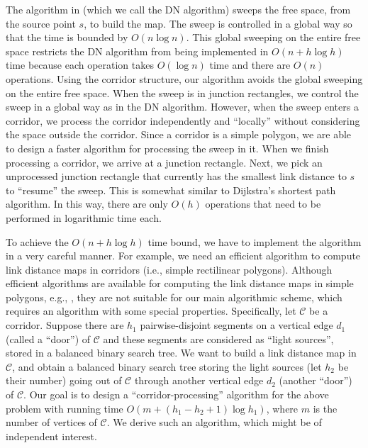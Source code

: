 \documentclass[english,runningheads,11pt]{llncs-revised}
\def\calC{\mathcal{C}}
\begin{document}
The algorithm in \cite{ref:DasGe91} (which we call the DN algorithm) sweeps the free space, from the source point $s$, to build the map.
The sweep is controlled in a global way so that the time is bounded by
$O(n\log n)$. This global sweeping on the entire free space restricts the DN algorithm from being implemented in $O(n+h\log h)$ time because each operation takes $O(\log n)$ time and there are $O(n)$ operations. Using the corridor structure, our algorithm avoids the global sweeping on the entire free space.
When the sweep is in junction rectangles, we control the sweep in a global way as
in the DN algorithm. However, when the sweep enters a corridor,
we process the corridor independently and ``locally'' without considering the
space outside the corridor. Since a
corridor is a simple polygon, we are able to design a
faster algorithm for processing the sweep in it.
When we finish processing a corridor, we arrive at a junction rectangle.
Next, we pick an unprocessed junction
rectangle that currently has the smallest link distance to $s$ to
``resume'' the sweep. This is somewhat similar to Dijkstra's shortest path algorithm.
In this way, there are only $O(h)$ operations that need to be performed in logarithmic time each.


To achieve the $O(n+h\log h)$ time bound, we have to implement the algorithm in a very careful manner. For example, we need an efficient
algorithm to compute link distance maps in corridors (i.e.,
simple rectilinear polygons).
Although efficient algorithms are available for computing the link
distance maps in simple polygons, e.g.,
\cite{ref:deBergOn91,ref:HershbergerCo94,ref:LingasOp95,ref:SchuiererAn96},
they are not suitable for our main algorithmic scheme, which requires
an algorithm with some special properties. Specifically, let
$\calC$ be a corridor. Suppose there are $h_1$
pairwise-disjoint segments on a vertical edge $d_1$ (called a
``door'') of $\calC$ and these segments are considered as ``light sources'', stored in a balanced binary search tree.  We
want to build a link distance map in $\calC$, and obtain a balanced
binary search tree storing the light sources (let $h_2$ be their number)
going out of $\calC$ through another vertical edge $d_2$
(another ``door'') of $\calC$. Our goal is to design
a ``corridor-processing'' algorithm for the above problem with running time
$O(m+(h_1-h_2+1)\log h_1)$, where $m$ is the number of vertices of $\calC$. We derive such an
algorithm, which might be of independent interest.
\end{document}
